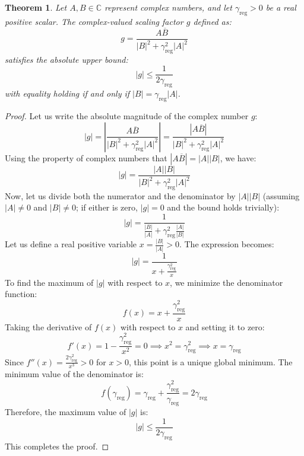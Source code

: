 \documentclass{article}
\theoremstyle{plain}
\newtheorem{theorem}{Theorem}[section]
\theoremstyle{definition}
\theoremstyle{remark}
\begin{document}
\begin{theorem}
Let $A, B \in \mathbb{C}$ represent complex numbers, and let $\gamma_{\text{reg}} > 0$ be a real positive scalar. The complex-valued scaling factor $g$ defined as:
\begin{equation}
    g = \frac{A \overline{B}}{|B|^2 + \gamma_{\text{reg}}^2 |A|^2}
\end{equation}
satisfies the absolute upper bound:
\begin{equation}
    |g| \leq \frac{1}{2 \gamma_{\text{reg}}}
\end{equation}
with equality holding if and only if $|B| = \gamma_{\text{reg}} |A|$.
\end{theorem}

\begin{proof}
Let us write the absolute magnitude of the complex number $g$:
\begin{equation}
    |g| = \left| \frac{A \overline{B}}{|B|^2 + \gamma_{\text{reg}}^2 |A|^2} \right| = \frac{|A \overline{B}|}{|B|^2 + \gamma_{\text{reg}}^2 |A|^2}
\end{equation}
Using the property of complex numbers that $|A \overline{B}| = |A| |B|$, we have:
\begin{equation}
    |g| = \frac{|A| |B|}{|B|^2 + \gamma_{\text{reg}}^2 |A|^2}
\end{equation}
Now, let us divide both the numerator and the denominator by $|A| |B|$ (assuming $|A| \neq 0$ and $|B| \neq 0$; if either is zero, $|g| = 0$ and the bound holds trivially):
\begin{equation}
    |g| = \frac{1}{\frac{|B|}{|A|} + \gamma_{\text{reg}}^2 \frac{|A|}{|B|}}
\end{equation}
Let us define a real positive variable $x = \frac{|B|}{|A|} > 0$. The expression becomes:
\begin{equation}
    |g| = \frac{1}{x + \frac{\gamma_{\text{reg}}^2}{x}}
\end{equation}
To find the maximum of $|g|$ with respect to $x$, we minimize the denominator function:
\begin{equation}
    f(x) = x + \frac{\gamma_{\text{reg}}^2}{x}
\end{equation}
Taking the derivative of $f(x)$ with respect to $x$ and setting it to zero:
\begin{equation}
    f'(x) = 1 - \frac{\gamma_{\text{reg}}^2}{x^2} = 0 \implies x^2 = \gamma_{\text{reg}}^2 \implies x = \gamma_{\text{reg}}
\end{equation}
Since $f''(x) = \frac{2 \gamma_{\text{reg}}^2}{x^3} > 0$ for $x > 0$, this point is a unique global minimum. The minimum value of the denominator is:
\begin{equation}
    f(\gamma_{\text{reg}}) = \gamma_{\text{reg}} + \frac{\gamma_{\text{reg}}^2}{\gamma_{\text{reg}}} = 2 \gamma_{\text{reg}}
\end{equation}
Therefore, the maximum value of $|g|$ is:
\begin{equation}
    |g| \leq \frac{1}{2 \gamma_{\text{reg}}}
\end{equation}
This completes the proof.
\end{proof}
\end{document}
